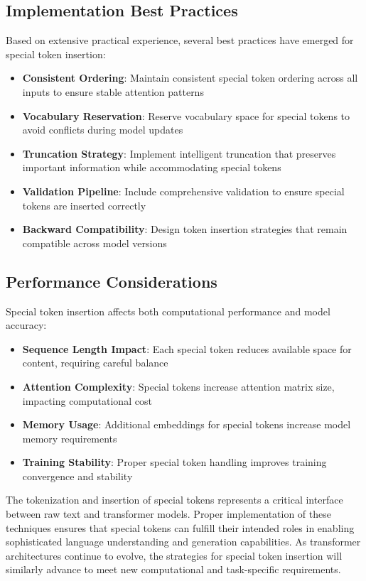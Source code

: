 \subsection{Implementation Best Practices}

Based on extensive practical experience, several best practices have emerged for special token insertion:

\begin{itemize}
\item \textbf{Consistent Ordering}: Maintain consistent special token ordering across all inputs to ensure stable attention patterns
\item \textbf{Vocabulary Reservation}: Reserve vocabulary space for special tokens to avoid conflicts during model updates
\item \textbf{Truncation Strategy}: Implement intelligent truncation that preserves important information while accommodating special tokens
\item \textbf{Validation Pipeline}: Include comprehensive validation to ensure special tokens are inserted correctly
\item \textbf{Backward Compatibility}: Design token insertion strategies that remain compatible across model versions
\end{itemize}

\subsection{Performance Considerations}

Special token insertion affects both computational performance and model accuracy:

\begin{itemize}
\item \textbf{Sequence Length Impact}: Each special token reduces available space for content, requiring careful balance
\item \textbf{Attention Complexity}: Special tokens increase attention matrix size, impacting computational cost
\item \textbf{Memory Usage}: Additional embeddings for special tokens increase model memory requirements
\item \textbf{Training Stability}: Proper special token handling improves training convergence and stability
\end{itemize}

The tokenization and insertion of special tokens represents a critical interface between raw text and transformer models. Proper implementation of these techniques ensures that special tokens can fulfill their intended roles in enabling sophisticated language understanding and generation capabilities. As transformer architectures continue to evolve, the strategies for special token insertion will similarly advance to meet new computational and task-specific requirements.